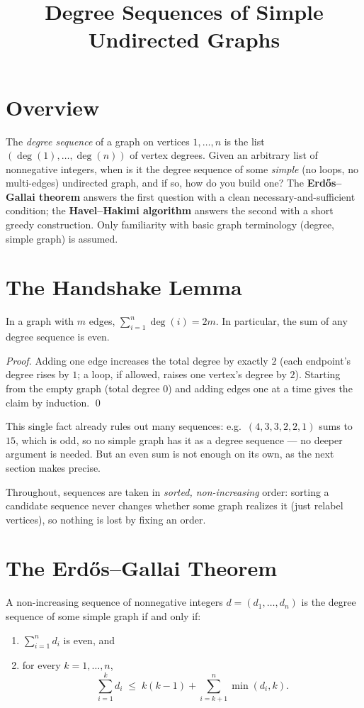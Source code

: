 \documentclass[11pt]{article}
\title{Degree Sequences of Simple Undirected Graphs}
\author{}
\date{}
\begin{document}
\thispagestyle{fancy}


\section{Overview}
The \emph{degree sequence} of a graph on vertices $1, \ldots, n$ is the
list $(\deg(1), \ldots, \deg(n))$ of vertex degrees. Given an arbitrary
list of nonnegative integers, when is it the degree sequence of some
\emph{simple} (no loops, no multi-edges) undirected graph, and if so, how
do you build one? The \textbf{Erd\H{o}s--Gallai theorem} answers the first
question with a clean necessary-and-sufficient condition; the
\textbf{Havel--Hakimi algorithm} answers the second with a short greedy
construction. Only familiarity with basic graph terminology (degree,
simple graph) is assumed.

\section{The Handshake Lemma}
\begin{theorembox}
In a graph with $m$ edges, $\sum_{i=1}^n \deg(i) = 2m$. In particular, the
sum of any degree sequence is even.

\emph{Proof.} Adding one edge increases the total degree by exactly $2$
(each endpoint's degree rises by $1$; a loop, if allowed, raises one
vertex's degree by $2$). Starting from the empty graph (total degree $0$)
and adding edges one at a time gives the claim by induction. \qed
\end{theorembox}

This single fact already rules out many sequences: e.g.\ $(4,3,3,2,2,1)$
sums to $15$, which is odd, so no simple graph has it as a degree
sequence --- no deeper argument is needed. But an even sum is not enough on
its own, as the next section makes precise.

Throughout, sequences are taken in \emph{sorted, non-increasing} order:
sorting a candidate sequence never changes whether some graph realizes it
(just relabel vertices), so nothing is lost by fixing an order.

\section{The Erd\H{o}s--Gallai Theorem}

\begin{theorembox}
A non-increasing sequence of nonnegative integers $d = (d_1, \ldots, d_n)$
is the degree sequence of some simple graph if and only if:
\begin{enumerate}[leftmargin=1.5em]
  \item $\sum_{i=1}^n d_i$ is even, and
  \item for every $k = 1, \ldots, n$,
        \[
          \sum_{i=1}^{k} d_i \;\le\; k(k-1) + \sum_{i=k+1}^{n} \min(d_i, k).
        \]
\end{enumerate}
\end{theorembox}
\end{document}
